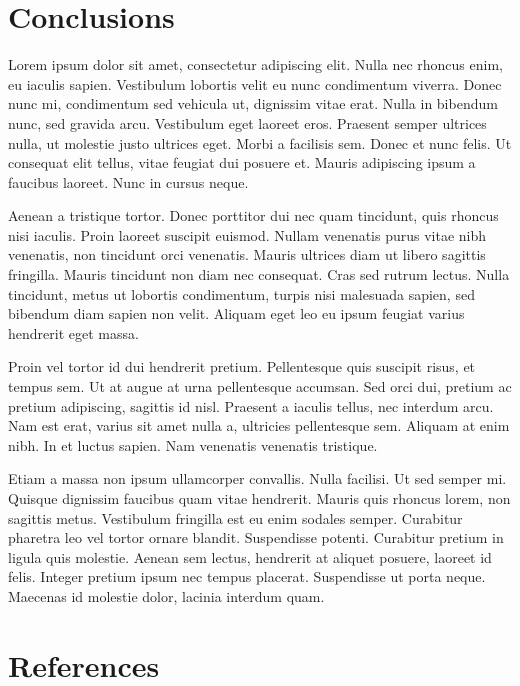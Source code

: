 \documentclass[final,5p,times,twocolumn]{elsarticle}
\begin{document}
\section{Conclusions}
\label{conclusions}

Lorem ipsum dolor sit amet, consectetur adipiscing elit. Nulla nec rhoncus
enim, eu iaculis sapien. Vestibulum lobortis velit eu nunc condimentum viverra.
Donec nunc mi, condimentum sed vehicula ut, dignissim vitae erat. Nulla in
bibendum nunc, sed gravida arcu. Vestibulum eget laoreet eros. Praesent semper
ultrices nulla, ut molestie justo ultrices eget. Morbi a facilisis sem. Donec
et nunc felis. Ut consequat elit tellus, vitae feugiat dui posuere et. Mauris
adipiscing ipsum a faucibus laoreet. Nunc in cursus neque.

Aenean a tristique tortor. Donec porttitor dui nec quam tincidunt, quis rhoncus
nisi iaculis. Proin laoreet suscipit euismod. Nullam venenatis purus vitae nibh
venenatis, non tincidunt orci venenatis. Mauris ultrices diam ut libero
sagittis fringilla. Mauris tincidunt non diam nec consequat. Cras sed rutrum
lectus. Nulla tincidunt, metus ut lobortis condimentum, turpis nisi malesuada
sapien, sed bibendum diam sapien non velit. Aliquam eget leo eu ipsum feugiat
varius hendrerit eget massa.

Proin vel tortor id dui hendrerit pretium. Pellentesque quis suscipit risus, et
tempus sem. Ut at augue at urna pellentesque accumsan. Sed orci dui, pretium ac
pretium adipiscing, sagittis id nisl. Praesent a iaculis tellus, nec interdum
arcu. Nam est erat, varius sit amet nulla a, ultricies pellentesque sem.
Aliquam at enim nibh. In et luctus sapien. Nam venenatis venenatis tristique.

Etiam a massa non ipsum ullamcorper convallis. Nulla facilisi. Ut sed semper
mi. Quisque dignissim faucibus quam vitae hendrerit. Mauris quis rhoncus lorem,
non sagittis metus. Vestibulum fringilla est eu enim sodales semper. Curabitur
pharetra leo vel tortor ornare blandit. Suspendisse potenti. Curabitur pretium
in ligula quis molestie. Aenean sem lectus, hendrerit at aliquet posuere,
laoreet id felis. Integer pretium ipsum nec tempus placerat. Suspendisse ut
porta neque. Maecenas id molestie dolor, lacinia interdum quam.

\section{References}
\label{references}

\end{document}

